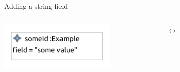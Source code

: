 \begin{frame}{Adding a string field}
\begin{columns}[c]
\begin{column}{0.45\textwidth}
        \centering
        \includegraphics[width=0.7\textwidth]{images/04_library_of_transformations/data_field_value.pdf}
    \end{column}\begin{column}{0.05\textwidth}
        \centering
        $\leftrightarrow$
    \end{column}\begin{column}{0.45\textwidth}
        \centering
        
    \end{column}
\end{columns}
\end{frame}

